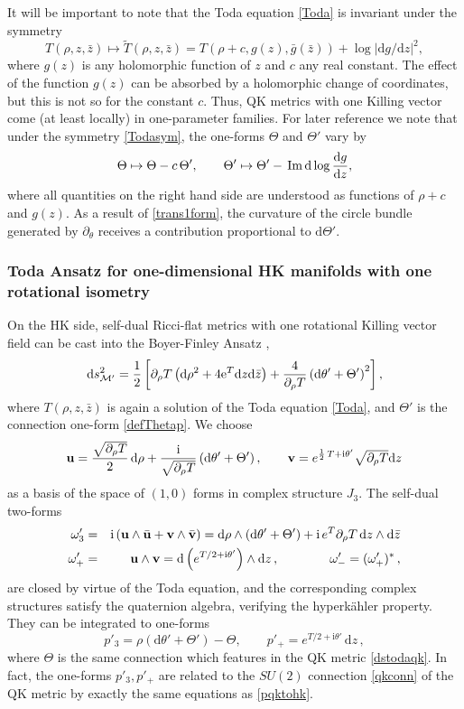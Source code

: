 \documentclass[12pt,reqno]{article}
\numberwithin{equation}{section}
\renewcommand{\Im}{\imag}
\DeclareMathOperator{\imag}{Im}
\newcommand{\be}{\begin{equation}}
\newcommand{\ee}{\end{equation}}
\newcommand{\beq}{\begin{eqnarray}}
\newcommand{\eeq}{\end{eqnarray}}
\def\Im{\,{\rm Im}\, }
\def\({\left(}
\def\){\right)}
\def\bz{\bar z}
\newcommand{\de}{\mathrm{d}}
\newcommand{\I}{\mathrm{i}}
\newcommand{\cM}{\mathcal{M}}
\def\pa{\partial}
\newcommand{\hk}{{hyperk\"ahler}\xspace}
\def\ub{{\bf u}}
\def\vb{{\bf v}}
\def\sigp{{\theta}}
\def\phip{{\theta'}}
\def\kcon{p'_3}
\def\hcon{p'_+}
\def\pTheta{\Theta'}
\def\pcM{\cM'}
\def\pomega{\omega'}
\numberwithin{equation}{section}
\begin{document}
It will be important to note that  the Toda equation \eqref{Toda} is invariant under
the symmetry
\be
\label{Todasym}
T(\rho,z,\bar z)\mapsto \tilde T(\rho,z,\bar z)=T(\rho+c,g(z),\bar g(\bz)) + \log | \de g/\de z|^2,
\ee
where $g(z)$ is any holomorphic function of $z$ and $c$ any real constant.
The effect of the function $g(z)$ can be absorbed by a holomorphic change of
coordinates, but this is not so for the constant $c$. Thus, QK metrics with one
Killing vector come (at least locally) in one-parameter families. For later reference
we note that under the symmetry \eqref{Todasym}, the one-forms $\Theta$ and $\pTheta$ vary by
\be
\Theta\mapsto \Theta-c\,\pTheta,
\qquad
\pTheta\mapsto\pTheta-\Im\de \log \frac{\de g}{\de z},
\label{trans1form}
\ee
where all quantities on the right hand side are understood as functions of $\rho+c$ and $g(z)$.
As a result of \eqref{trans1form}, the curvature of the circle bundle generated by $\pa_{\sigp}$
receives a contribution proportional to $\de\pTheta$.


\subsubsection{Toda Ansatz for one-dimensional HK manifolds with one rotational isometry}
\label{sec_TodaHK}

On the HK side, self-dual Ricci-flat metrics with one rotational Killing vector field
can be cast into the Boyer-Finley Ansatz \cite{MR660020,MR759978,Bakas:1989yj,
Bakas:1996gf},
\be
\label{dstodahk}
\de s_{\pcM}^2 = \frac12\left[ \pa_\rho T \left( \de \rho^2 + 4 {\rm e}^T \de z \de\bar z \right)
+ \frac{4}{\pa_\rho T}\(\de \phip+\pTheta \)^2\right],
\ee
where $T(\rho,z,\bar z)$ is again a solution of the Toda equation \eqref{Toda}, and
$\pTheta$ is the connection one-form \eqref{defThetap}. We choose
\be
\ub=\frac{\sqrt{\partial_\rho T}}{2}\, \de \rho + \frac{\I}{\sqrt{\partial_\rho T}}
\left(\de \phip+\pTheta \right),
\qquad
\vb=e^{\frac12\,T+\I\phip} \sqrt{\partial_\rho T} \de z
\ee
 as a basis of the space of $(1,0)$ forms in complex structure $J_3$.
The  self-dual two-forms
\beq
\label{om3hk}
\pomega_3&=&
\I \( \ub\wedge \bar \ub+ \vb\wedge \bar \vb\) =
\de\rho \wedge\left(\de \phip+\pTheta \right)
+\I\, e^T \partial_\rho T\, \de z\wedge \de\bz
\\
\pomega_+&=&\ub\wedge \vb= \de\( e^{T/2+\I\phip}\) \wedge \de z
\, ,\qquad \qquad
\pomega_-=(\pomega_+)^*\, ,
\eeq
are closed by virtue of the Toda equation, and the corresponding complex structures
satisfy the quaternion algebra, verifying the \hk property. They can be integrated
to one-forms
\be
\label{kahlercon1d}
\kcon= \rho \left( \de \phip+\pTheta \right)-\Theta ,
\qquad
\hcon= e^{T/2+\I\phip}\,  \de z\, ,
\ee
where $\Theta$ is the same connection which features in the QK metric \eqref{dstodaqk}.
In fact, the one-forms $\kcon, \hcon$ are related to the $SU(2)$ connection \eqref{qkconn}
of the QK metric by exactly the same equations as \eqref{pqktohk}.
\end{document}
